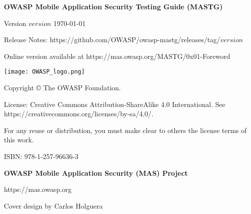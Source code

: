 \thispagestyle{empty} %

\textbf{OWASP Mobile Application Security Testing Guide (MASTG)}

Version $version$ \today

Release Notes: https://github.com/OWASP/owasp-mastg/releases/tag/$version$

Online version available at https://mas.owasp.org/MASTG/0x01-Foreword

\texttt{[image: OWASP\_logo.png]}

Copyright © The OWASP Foundation. 

License: Creative Commons Attribution-ShareAlike 4.0 International. See https://creativecommons.org/licenses/by-sa/4.0/.

For any reuse or distribution, you must make clear to others the license terms of this work.

ISBN: 978-1-257-96636-3 


\textbf{OWASP Mobile Application Security (MAS) Project}

https://mas.owasp.org


Cover design by Carlos Holguera